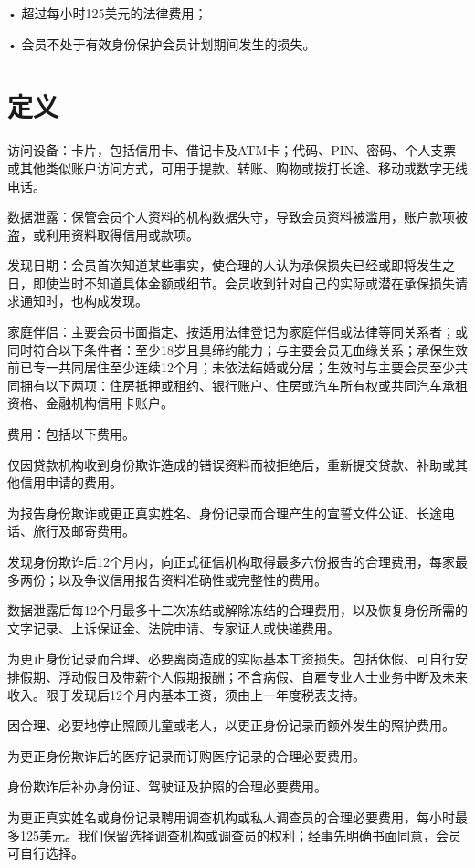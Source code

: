 \documentclass[UTF8,fontset=none,11pt,a4paper]{ctexart}
\begin{document}
• 超过每小时125美元的法律费用；


• 会员不处于有效身份保护会员计划期间发生的损失。


\section*{定义}
访问设备：卡片，包括信用卡、借记卡及ATM卡；代码、PIN、密码、个人支票或其他类似账户访问方式，可用于提款、转账、购物或拨打长途、移动或数字无线电话。


数据泄露：保管会员个人资料的机构数据失守，导致会员资料被滥用，账户款项被盗，或利用资料取得信用或款项。


发现日期：会员首次知道某些事实，使合理的人认为承保损失已经或即将发生之日，即使当时不知道具体金额或细节。会员收到针对自己的实际或潜在承保损失请求通知时，也构成发现。


家庭伴侣：主要会员书面指定、按适用法律登记为家庭伴侣或法律等同关系者；或同时符合以下条件者：至少18岁且具缔约能力；与主要会员无血缘关系；承保生效前已专一共同居住至少连续12个月；未依法结婚或分居；生效时与主要会员至少共同拥有以下两项：住房抵押或租约、银行账户、住房或汽车所有权或共同汽车承租资格、金融机构信用卡账户。


费用：包括以下费用。


仅因贷款机构收到身份欺诈造成的错误资料而被拒绝后，重新提交贷款、补助或其他信用申请的费用。


为报告身份欺诈或更正真实姓名、身份记录而合理产生的宣誓文件公证、长途电话、旅行及邮寄费用。


发现身份欺诈后12个月内，向正式征信机构取得最多六份报告的合理费用，每家最多两份；以及争议信用报告资料准确性或完整性的费用。


数据泄露后每12个月最多十二次冻结或解除冻结的合理费用，以及恢复身份所需的文字记录、上诉保证金、法院申请、专家证人或快递费用。


为更正身份记录而合理、必要离岗造成的实际基本工资损失。包括休假、可自行安排假期、浮动假日及带薪个人假期报酬；不含病假、自雇专业人士业务中断及未来收入。限于发现后12个月内基本工资，须由上一年度税表支持。


因合理、必要地停止照顾儿童或老人，以更正身份记录而额外发生的照护费用。


为更正身份欺诈后的医疗记录而订购医疗记录的合理必要费用。


身份欺诈后补办身份证、驾驶证及护照的合理必要费用。


为更正真实姓名或身份记录聘用调查机构或私人调查员的合理必要费用，每小时最多125美元。我们保留选择调查机构或调查员的权利；经事先明确书面同意，会员可自行选择。
\end{document}
